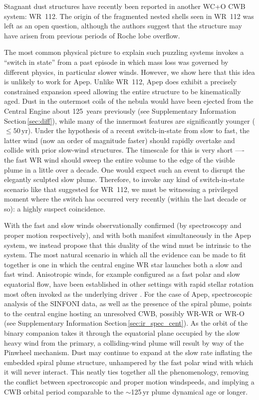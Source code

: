\documentclass[preprint,times]{aastex61}
\begin{document}

Stagnant dust structures have recently been reported in another WC+O CWB system: WR~112. The origin of the fragmented nested shells seen in WR~112 \citep{2017ApJ...835L..31L} was left as an open question, although the authors suggest that the structure may have arisen from previous periods of Roche lobe overflow. 

The most common physical picture to explain such puzzling systems invokes a ``switch in state'' from a past episode in which mass loss was governed by different physics, in particular slower winds. However, we show here that this idea is unlikely to work for Apep. Unlike WR~112, Apep does exhibit a precisely constrained expansion speed allowing the entire structure to be kinematically aged. Dust in the outermost coils of the nebula would have been ejected from the Central Engine about 125~years previously (see Supplementary Information Section\,\ref{sec:diff}), while many of the innermost features are significantly younger ($\leq 50$\,yr). Under the hypothesis of a recent switch-in-state from slow to fast, the latter wind (now an order of magnitude faster) should rapidly overtake and collide with prior slow-wind structures. The timescale for this is very short —- the fast WR wind should sweep the entire volume to the edge of the visible plume in a little over a decade. One would expect such an event to disrupt the elegantly sculpted slow plume. Therefore, to invoke any kind of switch-in-state scenario like that suggested for WR~112, we must be witnessing a privileged moment where the switch has occurred very recently (within the last decade or so): a highly suspect coincidence.

With the fast and slow winds observationally confirmed (by spectroscopy and proper motion respectively), and with both manifest simultaneously in the Apep system, we instead propose that this duality of the wind must be intrinsic to the system. The most natural scenario in which all the evidence can be made to fit together is one in which the central engine WR star launches both a slow and fast wind. Anisotropic winds, for example configured as a fast polar and slow equatorial flow, have been established in other settings \citep{2006ApJ...638L..33G,2008A&A...485..245G} with rapid stellar rotation most often invoked as the underlying driver \citep{2004A&A...418..639A,2014A&A...562A.118S}. For the case of Apep, spectroscopic analysis of the SINFONI data, as well as the presence of the spiral plume, points to the central engine hosting an unresolved CWB, possibly WR-WR or WR-O (see Supplementary Information Section\,\ref{sec:ir_spec_cent}). As the orbit of the binary companion takes it through the equatorial plane occupied by the slow heavy wind from the primary, a colliding-wind plume will result by way of the Pinwheel mechanism. Dust may continue to expand at the slow rate inflating the embedded spiral plume structure, unhampered by the fast polar wind with which it will never interact. This neatly ties together all the phenomenology, removing the conflict between spectroscopic and proper motion windspeeds, and implying a CWB orbital period comparable to the $\sim$125\,yr plume dynamical age or longer.
\end{document}
